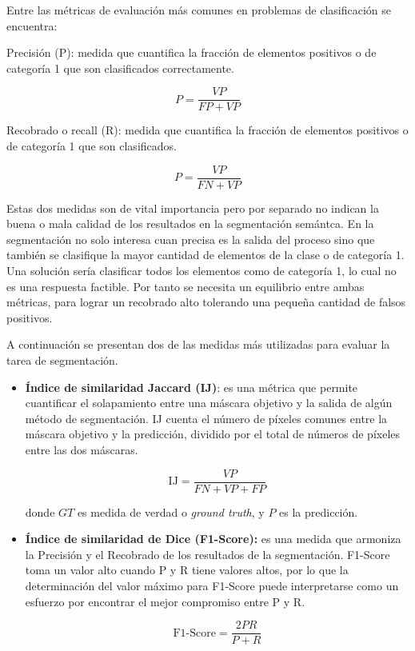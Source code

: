 Entre las métricas de evaluación más comunes en problemas de clasificación se encuentra:

\begin{definition}
	Precisión (P): medida que cuantifica la fracción de elementos positivos o de categoría 1 que son clasificados correctamente. 
	
	$$ P = \frac{VP}{FP + VP}$$	
\end{definition}

\begin{definition}
	Recobrado o recall (R): medida que cuantifica la fracción de elementos positivos o de categoría 1 que son clasificados.
	
	$$ P = \frac{VP}{FN + VP}$$	
\end{definition}

Estas dos medidas son de vital importancia pero por separado no indican la buena o mala calidad de los resultados en la segmentación semántca. En la segmentación no solo interesa cuan precisa es la salida del proceso sino que también se clasifique la mayor cantidad de elementos de la clase o de categoría 1. Una solución sería clasificar todos los elementos como de categoría 1, lo cual no es una respuesta factible. Por tanto se necesita un equilibrio entre ambas métricas, para lograr un recobrado alto tolerando una pequeña cantidad de falsos positivos.

A continuación se presentan dos de las medidas más utilizadas para evaluar la tarea de segmentación.

\begin{itemize}
	\item \textbf{Índice de similaridad Jaccard (IJ)}: es una métrica que permite cuantificar el solapamiento entre una máscara objetivo y la salida de algún método de segmentación. IJ cuenta el número de píxeles comunes entre la máscara objetivo y la predicción, dividido por el total de números de píxeles entre las dos máscaras.
	
	\begin{equation}
		\text{IJ} = \frac{VP}{FN + VP + FP}
	\end{equation}

	donde $GT$ es medida de verdad o \textit{ground truth}, y $P$ es la predicción.
	
	\item \textbf{Índice de similaridad de Dice (F1-Score):} es una medida que armoniza la Precisión y el Recobrado de los resultados de la segmentación. F1-Score toma un valor alto cuando P y R tiene valores altos, por lo que la determinación del valor máximo para F1-Score puede interpretarse como un esfuerzo por encontrar el mejor compromiso entre P y R.
	
		
	\begin{equation}
		\text{F1-Score} = \frac{2PR}{P + R}
	\end{equation}
\end{itemize}



